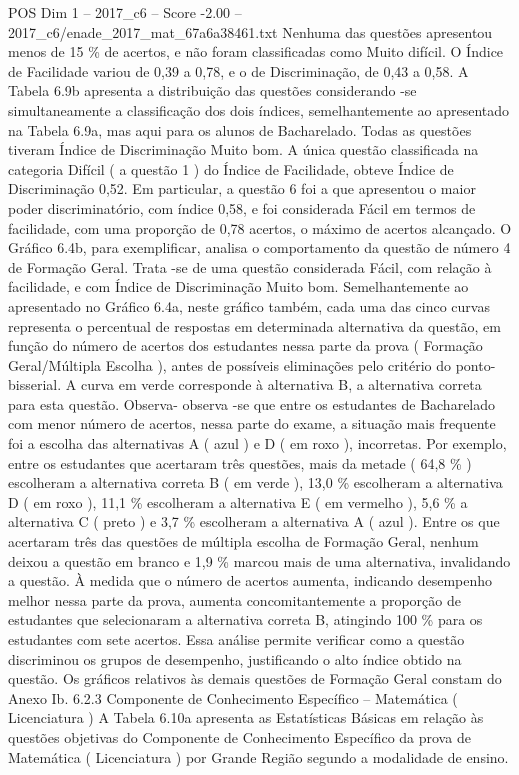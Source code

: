 \begin{textsample}{POS Dim 1 – 2017\_c6 – Score -2.00 – 2017\_c6/enade\_2017\_mat\_67a6a38461.txt}
Nenhuma das questões apresentou menos de 15 \% de acertos, e não foram classificadas como Muito difícil.
O Índice de Facilidade variou de 0,39 a 0,78, e o de Discriminação, de 0,43 a 0,58.
A Tabela 6.9b apresenta a distribuição das questões considerando -se simultaneamente a classificação dos dois índices, semelhantemente ao apresentado na Tabela 6.9a, mas aqui para os alunos de Bacharelado.
Todas as questões tiveram Índice de Discriminação Muito bom.
A única questão classificada na categoria Difícil ( a questão 1 ) do Índice de Facilidade, obteve Índice de Discriminação 0,52.
Em particular, a questão 6 foi a que apresentou o maior poder discriminatório, com índice 0,58, e foi considerada Fácil em termos de facilidade, com uma proporção de 0,78 acertos, o máximo de acertos alcançado.
O Gráfico 6.4b, para exemplificar, analisa o comportamento da questão de número 4 de Formação Geral.
Trata -se de uma questão considerada Fácil, com relação à facilidade, e com Índice de Discriminação Muito bom.
Semelhantemente ao apresentado no Gráfico 6.4a, neste gráfico também, cada uma das cinco curvas representa o percentual de respostas em determinada alternativa da questão, em função do número de acertos dos estudantes nessa parte da prova ( Formação Geral/Múltipla Escolha ), antes de possíveis eliminações pelo critério do ponto-bisserial.
A curva em verde corresponde à alternativa B, a alternativa correta para esta questão.
Observa- observa -se que entre os estudantes de Bacharelado com menor número de acertos, nessa parte do exame, a situação mais frequente foi a escolha das alternativas A ( azul ) e D ( em roxo ), incorretas.
Por exemplo, entre os estudantes que acertaram três questões, mais da metade ( 64,8 \% ) escolheram a alternativa correta B ( em verde ), 13,0 \% escolheram a alternativa D ( em roxo ), 11,1 \% escolheram a alternativa E ( em vermelho ), 5,6 \% a alternativa C ( preto ) e 3,7 \% escolheram a alternativa A ( azul ).
Entre os que acertaram três das questões de múltipla escolha de Formação Geral, nenhum deixou a questão em branco e 1,9 \% marcou mais de uma alternativa, invalidando a questão.
À medida que o número de acertos aumenta, indicando desempenho melhor nessa parte da prova, aumenta concomitantemente a proporção de estudantes que selecionaram a alternativa correta B, atingindo 100 \% para os estudantes com sete acertos.
Essa análise permite verificar como a questão discriminou os grupos de desempenho, justificando o alto índice obtido na questão.
Os gráficos relativos às demais questões de Formação Geral constam do Anexo Ib. 6.2.3 Componente de Conhecimento Específico – Matemática ( Licenciatura ) A Tabela 6.10a apresenta as Estatísticas Básicas em relação às questões objetivas do Componente de Conhecimento Específico da prova de Matemática ( Licenciatura ) por Grande Região segundo a modalidade de ensino.

\end{textsample}
